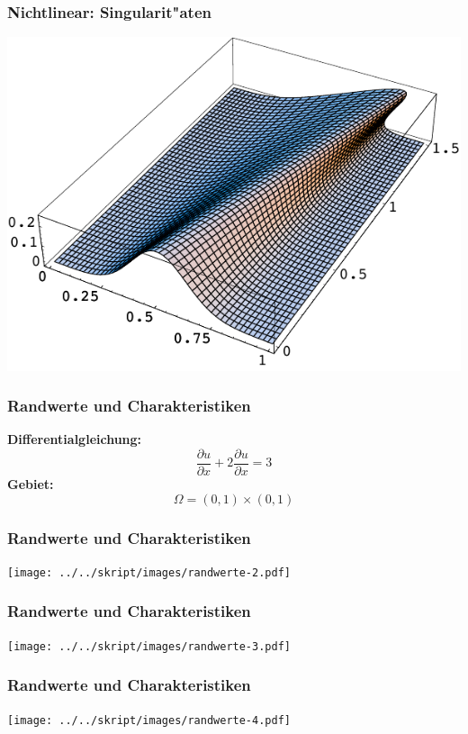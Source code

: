 \documentclass{beamer}
\begin{document}
\begin{frame}
\frametitle{Nichtlinear: Singularit"aten}
\begin{center}
\includegraphics[width=\hsize]{../../skript/graphics/welle.pdf}
\end{center}
\end{frame}

\begin{frame}
\frametitle{Randwerte und Charakteristiken}

{\bf Differentialgleichung:}
\[
\frac{\partial u}{\partial x}
+
2\frac{\partial u}{\partial x}
= 3
\]
{\bf Gebiet:}
\[
\Omega = (0,1)\times(0,1)
\]
\end{frame}

\begin{frame}
\frametitle{Randwerte und Charakteristiken}
\begin{center}
\texttt{[image: ../../skript/images/randwerte-2.pdf]}
\end{center}
\end{frame}

\begin{frame}
\frametitle{Randwerte und Charakteristiken}
\begin{center}
\texttt{[image: ../../skript/images/randwerte-3.pdf]}
\end{center}
\end{frame}

\begin{frame}
\frametitle{Randwerte und Charakteristiken}
\begin{center}
\texttt{[image: ../../skript/images/randwerte-4.pdf]}
\end{center}
\end{frame}
\end{document}
